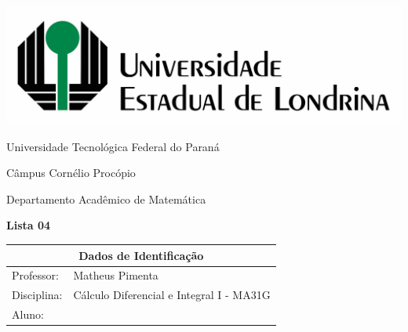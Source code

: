 \documentclass[oneside,a4paper,12pt]{article}
\newcommand{\universidade}{Universidade Tecnológica Federal do Paraná}
\newcommand{\centro}{Câmpus Cornélio Procópio}
\newcommand{\departamento}{Departamento Acadêmico de Matemática}
\newcommand{\curso}{Engenharia da Computação}
\newcommand{\professores}{Matheus Pimenta}
\newcommand{\disciplina}{Cálculo Diferencial e Integral I - MA31G}
\begin{document}
	\pagestyle{empty}
	
	\begin{center}
		\includegraphics[width=\linewidth/2]{logo.jpg}%
	 	\vspace{2pt} 	
		
		\universidade
		\par
		\centro
		\par
		\departamento
		\par
		\par
		\vspace{12pt}
		\LARGE \textbf{Lista 04}
		
	\end{center}
	
	\vspace{12pt}
	
	\begin{tabular}{ |l|p{12cm}| }
		
		\hline
		\multicolumn{2}{|c|}{\textbf{Dados de Identificação}} \\
		\hline
		Professor:         &    \professores           \\
		\hline
		Disciplina:        &    \disciplina          \\
		\hline
		Aluno:             &                   \\
		\hline
		
	\end{tabular}
	\vspace{6pt}
	
	
	\begin{snugshade}
	\end{snugshade}
\end{document}
